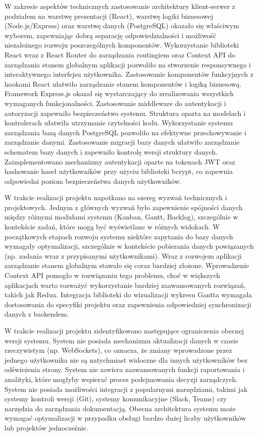 W zakresie aspektów technicznych zastosowanie architektury klient-serwer z podziałem na warstwę prezentacji (React), warstwę logiki biznesowej (Node.js/Express) oraz warstwę danych (PostgreSQL) okazało się właściwym wyborem, zapewniając dobrą separację odpowiedzialności i możliwość niezależnego rozwoju poszczególnych komponentów. Wykorzystanie biblioteki React wraz z React Router do zarządzania routingiem oraz Context API do zarządzania stanem globalnym aplikacji pozwoliło na stworzenie responsywnego i interaktywnego interfejsu użytkownika. Zastosowanie komponentów funkcyjnych z hookami React ułatwiło zarządzanie stanem komponentów i logiką biznesową. Framework Express.js okazał się wystarczający do zrealizowania wszystkich wymaganych funkcjonalności. Zastosowanie middleware do autentykacji i autoryzacji zapewniło bezpieczeństwo systemu. Struktura oparta na modelach i kontrolerach ułatwiła utrzymanie czytelności kodu. Wykorzystanie systemu zarządzania bazą danych PostgreSQL pozwoliło na efektywne przechowywanie i zarządzanie danymi. Zastosowanie migracji bazy danych ułatwiło zarządzanie schematem bazy danych i zapewniło kontrolę wersji struktury danych. Zaimplementowano mechanizmy autentykacji oparte na tokenach JWT oraz hashowanie haseł użytkowników przy użyciu biblioteki bcrypt, co zapewnia odpowiedni poziom bezpieczeństwa danych użytkowników.

W trakcie realizacji projektu napotkano na szereg wyzwań technicznych i projektowych. Jednym z głównych wyzwań było zapewnienie spójności danych między różnymi modułami systemu (Kanban, Gantt, Backlog), szczególnie w kontekście zadań, które mogą być wyświetlane w różnych widokach. W początkowych etapach rozwoju systemu niektóre zapytania do bazy danych wymagały optymalizacji, szczególnie w kontekście pobierania danych powiązanych (np. zadania wraz z przypisanymi użytkownikami). Wraz z rozwojem aplikacji zarządzanie stanem globalnym stawało się coraz bardziej złożone. Wprowadzenie Context API pomogło w rozwiązaniu tego problemu, choć w większych aplikacjach warto rozważyć wykorzystanie bardziej zaawansowanych rozwiązań, takich jak Redux. Integracja biblioteki do wizualizacji wykresu Gantta wymagała dostosowania do specyfiki projektu oraz zapewnienia odpowiedniej synchronizacji danych z backendem.

W trakcie realizacji projektu zidentyfikowano następujące ograniczenia obecnej wersji systemu. System nie posiada mechanizmu aktualizacji danych w czasie rzeczywistym (np. WebSockets), co oznacza, że zmiany wprowadzone przez jednego użytkownika nie są natychmiast widoczne dla innych użytkowników bez odświeżenia strony. System nie zawiera zaawansowanych funkcji raportowania i analityki, które mogłyby wspierać proces podejmowania decyzji zarządczych. System nie posiada możliwości integracji z popularnymi narzędziami, takimi jak systemy kontroli wersji (Git), systemy komunikacyjne (Slack, Teams) czy narzędzia do zarządzania dokumentacją. Obecna architektura systemu może wymagać optymalizacji w przypadku obsługi bardzo dużej liczby użytkowników lub projektów jednocześnie.

